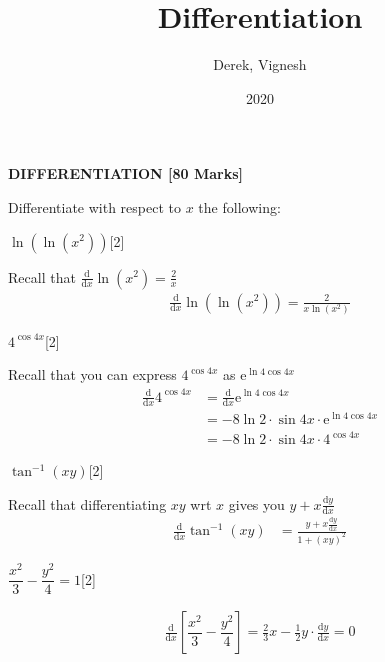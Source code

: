 \documentclass[12pt, a4 paper]{article}
\title{Differentiation}
\author{Derek, Vignesh}
\date{2020}
\begin{document}
\maketitle

\textbf{DIFFERENTIATION [80 Marks]}
\begin{outline}[enumerate]

 \1 Differentiate with respect to \(x\) the following: %

 \2 \(\ln (\ln ({x^2}))\)\hfill[2]
 \begin{answer}
  Recall that \(\frac{\mathrm{d}}{\mathrm{d}x}\ln(x^2)=\frac{2}{x}\)
  \begin{align*}
   \frac{\mathrm{d}}{\mathrm{d}x}\ln (\ln ({x^2})) = \frac{2}{x\ln ({x^2})}
  \end{align*}
 \end{answer}

 \2 \(4^{\cos 4x}\)\hfill[2]
 \begin{answer}
  Recall that you can express \(4^{\cos4x}\) as \(\mathrm{e}^{\ln4\cos4x}\)
  \begin{align*}
   \frac{\mathrm{d}}{\mathrm{d}x}4^{\cos 4x} & =\frac{\mathrm{d}}{\mathrm{d}x}\mathrm{e}^{\ln4\cos4x} \\
                                             & = -8\ln2 \cdot \sin4x \cdot \mathrm{e}^{\ln4\cos4x}    \\
                                             & = -8\ln2 \cdot \sin4x \cdot 4^{\cos4x}
  \end{align*}
 \end{answer}

 \2 \(\tan ^{ - 1}(xy)\)\hfill[2]
 \begin{answer}
  Recall that differentiating \(xy\) wrt \(x\) gives you \(y+x\frac{\mathrm{d}y}{\mathrm{d}x}\)
  \begin{align*}
   \frac{\mathrm{d}}{\mathrm{d}x}\tan ^{ - 1}(xy) & = \frac{y+x\frac{\mathrm{d}y}{\mathrm{d}x}}{1+{(xy)}^2}
  \end{align*}
 \end{answer}

 \2 \(\dfrac{{{x^2}}}{3} - \dfrac{{{y^2}}}{4} = 1\)\hfill[2]
 \begin{answer}
  \begin{align*}
   \frac{\mathrm{d}}{\mathrm{d}x}\left[\dfrac{{{x^2}}}{3} - \dfrac{{{y^2}}}{4}\right] = \frac{2}{3}x-\frac{1}{2}y\cdot\frac{\mathrm{d}y}{\mathrm{d}x} = 0
  \end{align*}
 \end{answer}


\end{outline}
\end{document}
